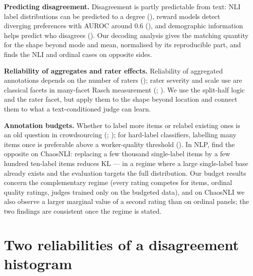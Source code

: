 \documentclass[10pt]{article}
\begin{document}
\textbf{Predicting disagreement.} Disagreement is partly predictable from text: NLI label distributions can be predicted to a degree (\citealp{zhou2022distributed}), reward models detect diverging preferences with AUROC around 0.6 (\citealp{zhang2025diverging}), and demographic information helps predict who disagrees (\citealp{wan2023everyone}). Our decoding analysis gives the matching quantity for the shape beyond mode and mean, normalised by its reproducible part, and finds the NLI and ordinal cases on opposite sides.

\textbf{Reliability of aggregates and rater effects.} Reliability of aggregated annotations depends on the number of raters (\citealp{wong2022krater}); rater severity and scale use are classical facets in many-facet Rasch measurement (\citealp{linacre1989mfrm}; \citealp{eckes2011mfrm}). We use the split-half logic and the rater facet, but apply them to the shape beyond location and connect them to what a text-conditioned judge can learn.

\textbf{Annotation budgets.} Whether to label more items or relabel existing ones is an old question in crowdsourcing (\citealp{sheng2008get}; \citealp{lin2014relabel}); for hard-label classifiers, labelling many items once is preferable above a worker-quality threshold (\citealp{khetan2018learning}). In NLP, \citet{zhang2021learning} find the opposite on ChaosNLI: replacing a few thousand single-label items by a few hundred ten-label items reduces KL --- in a regime where a large single-label base already exists and the evaluation targets the full distribution. Our budget results concern the complementary regime (every rating competes for items, ordinal quality ratings, judges trained only on the budgeted data), and on ChaosNLI we also observe a larger marginal value of a second rating than on ordinal panels; the two findings are consistent once the regime is stated.

\section{Two reliabilities of a disagreement histogram}


\end{document}

